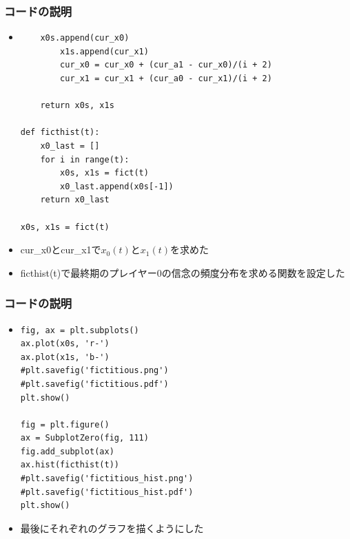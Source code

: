 \documentclass[dvipdfmx,fleqn,jsarticle]{beamer}
\begin{document}
\begin{frame}[fragile]%
\frametitle{コードの説明}
\begin{itemize}\setlength{\parskip}{0.5em}
\item
\scriptsize
\begin{verbatim}        
	x0s.append(cur_x0)
        x1s.append(cur_x1)
        cur_x0 = cur_x0 + (cur_a1 - cur_x0)/(i + 2)
        cur_x1 = cur_x1 + (cur_a0 - cur_x1)/(i + 2)

    return x0s, x1s

def ficthist(t):
    x0_last = []
    for i in range(t):
        x0s, x1s = fict(t)
        x0_last.append(x0s[-1])
    return x0_last

x0s, x1s = fict(t)

\end{verbatim}
\normalsize

\item
cur\_x0とcur\_x1で$x_0(t)$と$x_1(t)$を求めた
\item
ficthist(t)で最終期のプレイヤー0の信念の頻度分布を求める関数を設定した

\end{itemize}
\end{frame}

\begin{frame}[fragile]%
\frametitle{コードの説明}
\begin{itemize}\setlength{\parskip}{0.5em}
\item
\begin{verbatim}
fig, ax = plt.subplots()
ax.plot(x0s, 'r-')
ax.plot(x1s, 'b-')
#plt.savefig('fictitious.png')
#plt.savefig('fictitious.pdf')
plt.show()

fig = plt.figure()
ax = SubplotZero(fig, 111)
fig.add_subplot(ax)
ax.hist(ficthist(t))
#plt.savefig('fictitious_hist.png')
#plt.savefig('fictitious_hist.pdf')
plt.show()
\end{verbatim}
\normalsize

\item
最後にそれぞれのグラフを描くようにした
\end{itemize}
\end{frame}
\end{document}
